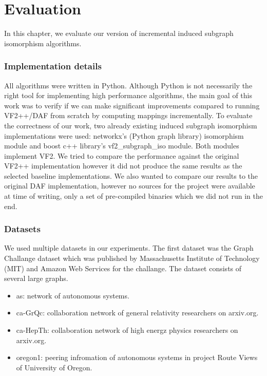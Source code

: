 \chapter{Evaluation}

In this chapter, we evaluate our version of incremental induced subgraph isomorphism algorithms.

\subsection{Implementation details}

All algorithms were written in Python. Although Python is not necessarily the right tool 
for implementing high performance algorithms, the main goal of this work was to verify if
we can make significant improvements compared to running VF2++/DAF from scratch by computing
mappings incrementally. To evaluate the correctness of our work, two already existing induced 
subgraph isomorphism implementations were used: networkx's (Python graph library) isomorphism 
module and boost c++ library's vf2\_subgraph\_iso module\cite{boostvf2}. Both modules implement VF2. We 
tried to compare the performance against the original VF2++ implementation \cite{lemonvf2pp}
however it did not produce the same results as the selected baseline implementations. We also
wanted to compare our results to the original DAF implementation, however no sources for the
project were available at time of writing, only a set of pre-compiled binaries \cite{dafbin}
which we did not run in the end.

\subsection{Datasets}

We used multiple datasets in our experiments. The first dataset was the Graph Challange\cite{graphchallenge} dataset
which was published by Massachusetts Institute of Technology (MIT) and Amazon Web Services for
the challange. The dataset consists of several large graphs. 

\begin{itemize}
    \item as: network of autonomous systems.
    \item ca-GrQc: collaboration network of general relativity researchers on arxiv.org.
    \item ca-HepTh: collaboration network of high energz physics researchers on arxiv.org.
    \item oregon1: peering infromation of autonomous systems in project Route Views of University of Oregon.
\end{itemize}

